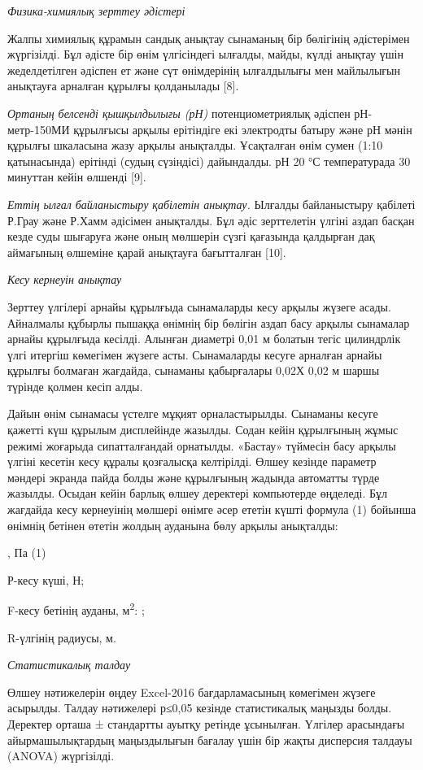\begin{multicols}{2}
\emph{Физика-химиялық зерттеу әдістері}

Жалпы химиялық құрамын сандық анықтау сынаманың бір бөлігінің
әдістерімен жүргізілді. Бұл әдісте бір өнім үлгісіндегі ылғалды, майды,
күлді анықтау үшін жеделдетілген әдіспен ет және сүт өнімдерінің
ылғалдылығы мен майлылығын анықтауға арналған құрылғы қолданылады
{[}8{]}.

\emph{Ортаның белсенді қышқылдылығы (рН)} потенциометриялық әдіспен
рН-метр-150МИ құрылғысы арқылы ерітіндіге екі электродты батыру және рН
мәнін құрылғы шкаласына жазу арқылы анықталды. Ұсақталған өнім сумен
(1:10 қатынасында) ерітінді (судың сүзіндісі) дайындалды. рН 20 °С
температурада 30 минуттан кейін өлшенді {[}9{]}.

\emph{Еттің ылғал байланыстыру қабілетін анықтау.} Ылғалды байланыстыру
қабілеті Р.Грау және Р.Хамм әдісімен анықталды. Бұл әдіс зерттелетін
үлгіні аздап басқан кезде суды шығаруға және оның мөлшерін сүзгі
қағазында қалдырған дақ аймағының өлшеміне қарай анықтауға бағытталған
{[}10{]}.

\emph{Кесу кернеуін анықтау}

Зерттеу үлгілері арнайы құрылғыда сынамаларды кесу арқылы жүзеге асады.
Айналмалы құбырлы пышаққа өнімнің бір бөлігін аздап басу арқылы
сынамалар арнайы құрылғыда кесілді. Алынған диаметрі 0,01 м болатын
тегіс цилиндрлік үлгі итергіш көмегімен жүзеге асты. Сынамаларды кесуге
арналған арнайы құрылғы болмаған жағдайда, сынаманы қабырғалары 0,02Х
0,02 м шаршы түрінде қолмен кесіп алды.

Дайын өнім сынамасы үстелге мұқият орналастырылды. Сынаманы кесуге
қажетті күш құрылым дисплейінде жазылды. Содан кейін құрылғының жұмыс
режимі жоғарыда сипатталғандай орнатылды. «Бастау» түймесін басу арқылы
үлгіні кесетін кесу құралы қозғалысқа келтірілді. Өлшеу кезінде параметр
мәндері экранда пайда болды және құрылғының жадында автоматты түрде
жазылды. Осыдан кейін барлық өлшеу деректері компьютерде өңделеді. Бұл
жағдайда кесу кернеуінің мөлшері өнімге әсер ететін күшті формула (1)
бойынша өнімнің бетінен өтетін жолдың ауданына бөлу арқылы анықталды:

, Па
(1)

Р-кесу күші, Н;

F-кесу бетінің ауданы, м\textsuperscript{2}:
;

R-үлгінің радиусы, м.

\emph{Статистикалық талдау}

Өлшеу нәтижелерін өңдеу Excel-2016 бағдарламасының көмегімен жүзеге
асырылды. Талдау нәтижелері р≤0,05 кезінде статистикалық маңызды болды.
Деректер орташа ± стандартты ауытқу ретінде ұсынылған. Үлгілер
арасындағы айырмашылықтардың маңыздылығын бағалау үшін бір жақты
дисперсия талдауы (ANOVA) жүргізілді.


\end{multicols}
